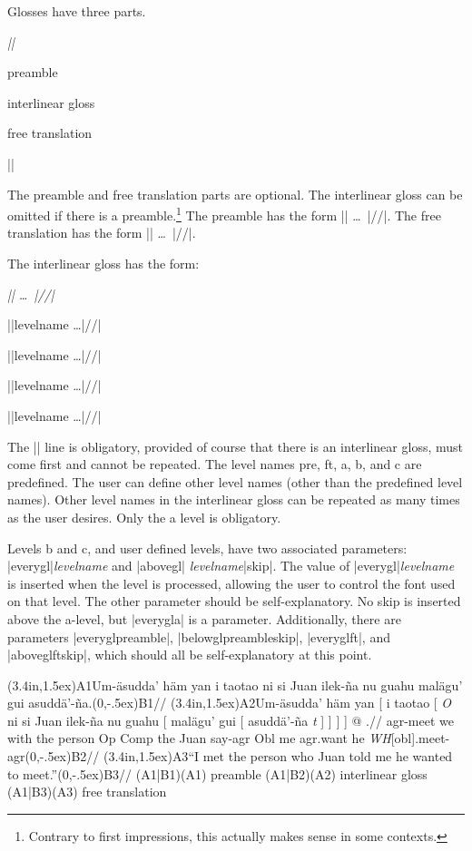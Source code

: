
Glosses have three parts.

\exdisplay
\it
|\begingl|\par
preamble\par
interlinear gloss\par
free translation\par
|\endgl|
\xe

The preamble and free translation parts are optional.  The interlinear
gloss can be omitted if there is a preamble.\footnote{%
Contrary to first impressions, this actually makes sense in some contexts.}
The preamble has the form |\glpreamble| \dots\ |//|.  The free translation
has the form |\glft| \dots\ |//|.

The interlinear gloss has the form:

\exdisplay
\it
|\gla| \dots\ |//|\par
|\gl|levelname \dots |//|\par
|\gl|levelname \dots |//|\par
|\gl|levelname \dots |//|\par
|\gl|levelname \dots |//|\par
\xe
The |\gla| line is obligatory, provided of course that there is an
interlinear gloss, must come first and cannot be repeated.  The level
names pre, ft, a, b, and c are predefined.  The user can define other
level names (other than the predefined level names).  Other level
names in the interlinear gloss can be repeated as many times as the
user desires.  Only the a level is obligatory.

Levels b and c, and user defined levels, have two associated
parameters: |everygl|{\it levelname} and |abovegl|{\it
levelname\/}|skip|.  The value of |everygl|{\it levelname} is inserted
when the level is processed, allowing the user to control the font
used on that level.  The other parameter should be self-explanatory.
No skip is inserted above the a-level, but |everygla| is a parameter.
Additionally, there are parameters |everyglpreamble|,
|belowglpreambleskip|, |everyglft|, and |aboveglftskip|, which should
all be self-explanatory at this point.



\ex
\def\TOP{\pnode(3.4in,1.5ex)}%
\def\BOT{\pnode(0,-.5ex)}%
\begingl[glwidth=3.2in]
\glpreamble \TOP{A1}Um-\"asudda' h\"am yan i taotao ni si Juan
ilek-\~na nu guahu mal\"agu' gui
asudd\"a'-\~na.\BOT{B1}//
\gla \TOP{A2}Um-\"asudda' h\"am yan [ i taotao [ {\it O\/} ni si Juan
ilek-\~na nu guahu [ mal\"agu' gui [ asudd\"a'-\~na {\it
t\/} ] ] ] ] @ .//
\glb agr-meet we with the person Op Comp the Juan say-agr Obl me
agr.want he {\it WH\/}[obl].meet-agr\BOT{B2}//
\glft \TOP{A3}``I met the person who Juan told me he wanted to
meet.''\BOT{B3}//
\endgl
\SpecialCoor
\psbrace[ref=lC](A1|B1)(A1){ preamble}
\psbrace[ref=lC](A1|B2)(A2){ interlinear gloss}
\psbrace[ref=lC](A1|B3)(A3){ free translation}
\xe


